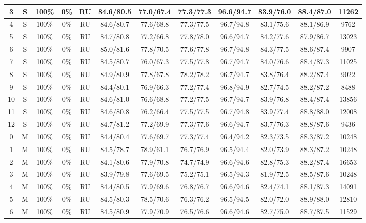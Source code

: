 \begin{table*}
{\begin{tabular}{|c|c|c|c|c||c|c|c|c|c|c||c|}
3 & S & 100\% & 0\% & RU & 84.6/80.5 & 77.0/67.4 & 77.3/77.3 & 96.6/94.7 & 83.9/76.0 & 88.4/87.0 & 11262 \\ \hline
4 & S & 100\% & 0\% & RU & 84.6/80.7 & 77.6/68.8 & 77.3/77.5 & 96.7/94.8 & 83.1/75.6 & 88.1/86.9 & 9762 \\ \hline
5 & S & 100\% & 0\% & RU & 84.7/80.8 & 77.2/66.8 & 77.8/78.0 & 96.6/94.7 & 84.2/77.6 & 87.9/86.7 & 13023 \\ \hline
6 & S & 100\% & 0\% & RU & 85.0/81.6 & 77.8/70.5 & 77.6/77.8 & 96.7/94.8 & 84.3/77.5 & 88.6/87.4 & 9907 \\ \hline
7 & S & 100\% & 0\% & RU & 84.5/80.7 & 76.0/67.3 & 77.5/77.8 & 96.7/94.7 & 84.0/76.6 & 88.4/87.3 & 11025 \\ \hline
8 & S & 100\% & 0\% & RU & 84.9/80.9 & 77.8/67.8 & 78.2/78.2 & 96.7/94.7 & 83.8/76.4 & 88.2/87.4 & 9022 \\ \hline
9 & S & 100\% & 0\% & RU & 84.4/80.1 & 76.9/66.3 & 77.2/77.4 & 96.8/94.9 & 82.7/74.5 & 88.2/87.2 & 8488 \\ \hline
10 & S & 100\% & 0\% & RU & 84.6/81.0 & 76.6/68.8 & 77.2/77.5 & 96.7/94.7 & 83.9/76.8 & 88.4/87.4 & 13856 \\ \hline
11 & S & 100\% & 0\% & RU & 84.6/80.8 & 76.2/66.4 & 77.5/77.5 & 96.7/94.8 & 83.9/77.4 & 88.8/88.0 & 12008 \\ \hline
12 & S & 100\% & 0\% & RU & 84.7/81.2 & 77.2/69.9 & 77.3/77.6 & 96.6/94.7 & 83.7/76.3 & 88.8/87.6 & 9436 \\ \hline
0 & M & 100\% & 0\% & RU & 84.4/80.4 & 77.6/69.7 & 77.3/77.4 & 96.4/94.2 & 82.3/73.5 & 88.3/87.2 & 10248 \\ \hline
1 & M & 100\% & 0\% & RU & 84.5/78.7 & 78.9/61.1 & 76.7/76.9 & 96.5/94.4 & 82.0/73.9 & 88.3/87.2 & 10248 \\ \hline
2 & M & 100\% & 0\% & RU & 84.1/80.6 & 77.9/70.8 & 74.7/74.9 & 96.6/94.6 & 82.8/75.3 & 88.2/87.4 & 16653 \\ \hline
3 & M & 100\% & 0\% & RU & 83.9/79.8 & 77.6/69.5 & 75.2/75.1 & 96.5/94.3 & 81.9/72.5 & 88.5/87.6 & 10248 \\ \hline
4 & M & 100\% & 0\% & RU & 84.4/80.5 & 77.9/69.6 & 76.8/76.7 & 96.6/94.6 & 82.4/74.1 & 88.1/87.3 & 14091 \\ \hline
5 & M & 100\% & 0\% & RU & 84.5/80.3 & 78.5/70.6 & 76.3/76.2 & 96.5/94.5 & 82.0/72.0 & 88.9/88.0 & 12810 \\ \hline
6 & M & 100\% & 0\% & RU & 84.5/80.9 & 77.9/70.9 & 76.5/76.6 & 96.6/94.6 & 82.7/75.0 & 88.7/87.5 & 11529 \\ \hline

\end{tabular}}
\end{table*}
